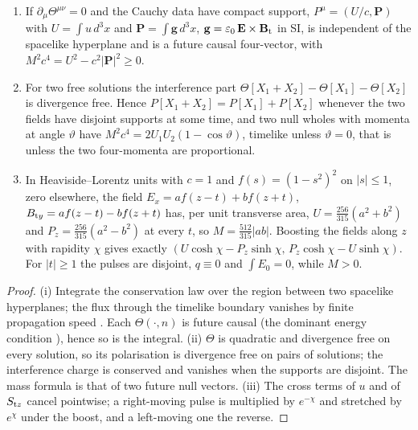 \begin{proposition}
\label{r2:prop:whole}
\begin{enumerate}[label=(\roman*),leftmargin=2.2em]
\item If $\partial_\mu\Theta^{\mu\nu}=0$ and the Cauchy data have compact support, $P^\mu=(U/c,\mathbf P)$ with $U=\int u\,d^3x$ and $\mathbf P=\int\mathbf g\,d^3x$,
$\mathbf g=\varepsilon_0\,\mathbf E\times\mathbf B_{\rm t}$ in SI, is independent of the spacelike hyperplane and is a future causal four-vector, with
$M^2c^4=U^2-c^2|\mathbf P|^2\ge0$.
\item For two free solutions the interference part $\Theta[X_1+X_2]-\Theta[X_1]-\Theta[X_2]$ is divergence free. Hence $P[X_1+X_2]=P[X_1]+P[X_2]$
whenever the two fields have disjoint supports at some time, and two null wholes with momenta at angle $\vartheta$ have
$M^2c^4=2U_1U_2(1-\cos\vartheta)$, timelike unless $\vartheta=0$, that is unless the two four-momenta are proportional.
\item In Heaviside--Lorentz units with $c=1$ and $f(s)=(1-s^2)^2$ on $|s|\le1$, zero elsewhere, the field $E_x=af(z-t)+bf(z+t)$,
$B_{{\rm t}y}=af(z-t)-bf(z+t)$ has, per unit transverse area, $U=\tfrac{256}{315}(a^2+b^2)$ and $P_z=\tfrac{256}{315}(a^2-b^2)$ at every $t$, so
$M=\tfrac{512}{315}|ab|$. Boosting the fields along $z$ with rapidity $\chi$ gives exactly $(U\cosh\chi-P_z\sinh\chi,\,P_z\cosh\chi-U\sinh\chi)$. For $|t|\ge1$ the
pulses are disjoint, $q\equiv0$ and $\int E_0=0$, while $M>0$.
\end{enumerate}
\end{proposition}

\begin{proof}
(i) Integrate the conservation law over the region between two spacelike hyperplanes; the flux through the timelike boundary vanishes by finite
propagation speed \cite{Laue1911,LandauLifshitz2}. Each $\Theta(\cdot,n)$ is future causal (the dominant energy condition \cite{HawkingEllis73}), hence so
is the integral. (ii) $\Theta$ is quadratic and divergence free on every solution, so its polarisation is divergence free on pairs of solutions; the
interference charge is conserved and vanishes when the supports are disjoint. The mass formula is that of two future null vectors. (iii) The cross terms
of $u$ and of $S_{{\rm t}z}$ cancel pointwise; a right-moving pulse is multiplied by $e^{-\chi}$ and stretched by $e^\chi$ under the boost, and a left-moving one
the reverse.
\end{proof}

